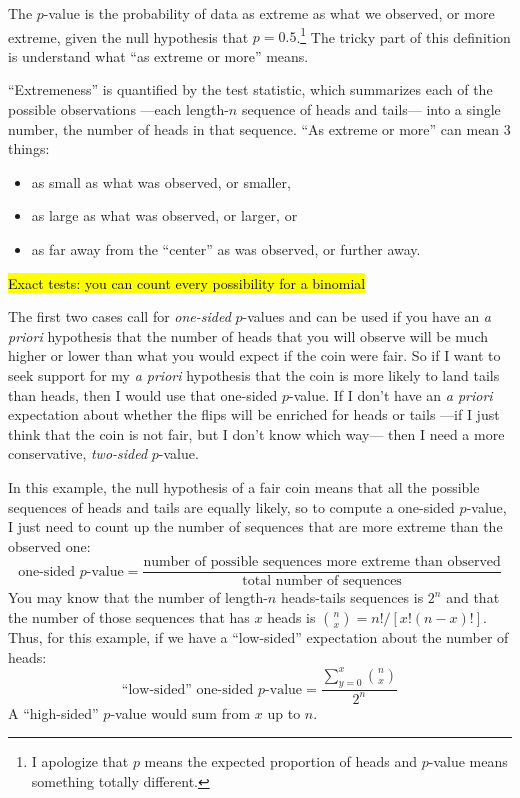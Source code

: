 The $p$-value is the probability of data as extreme as what we observed, or
more extreme, given the null hypothesis that $p = 0.5$.\footnote{I apologize
that $p$ means the expected proportion of heads and $p$-value means something
totally different.} The tricky part of this definition is understand what ``as
extreme or more'' means.

``Extremeness'' is quantified by the test statistic, which summarizes each of
the possible observations ---each length-$n$ sequence of heads and tails---
into a single number, the number of heads in that sequence. ``As extreme or
more'' can mean 3 things:
\begin{itemize}
    \item as small as what was observed, or smaller,
    \item as large as what was observed, or larger, or
    \item as far away from the ``center'' as was observed, or further away.
\end{itemize}

\hl{Exact tests: you can count every possibility for a binomial}

The first two cases call for \emph{one-sided} $p$-values and can be used if you
have an \textit{a priori} hypothesis that the number of heads that you will
observe will be much higher or lower than what you would expect if the coin
were fair. So if I want to seek support for my \textit{a priori} hypothesis
that the coin is more likely to land tails than heads, then I would use that
one-sided $p$-value. If I don't have an \textit{a priori} expectation about
whether the flips will be enriched for heads or tails ---if I just think that
the coin is not fair, but I don't know which way--- then I need a more
conservative, \emph{two-sided} $p$-value.

In this example, the null hypothesis of a fair coin means that all the possible
sequences of heads and tails are equally likely, so to compute a one-sided
$p$-value, I just need to count up the number of sequences that are more
extreme than the observed one:
\begin{equation}
    \text{one-sided $p$-value} = \frac{\text{number of possible sequences more extreme than observed}}{\text{total number of sequences}}
\end{equation}
You may know that the number of length-$n$ heads-tails sequences is $2^n$ and
that the number of those sequences that has $x$ heads is $\binom{n}{x} = n! /
\left[ x! (n-x)! \right]$. Thus, for this example, if we have a ``low-sided''
expectation about the number of heads:
\begin{equation}
    \text{``low-sided'' one-sided $p$-value} = \frac{\sum_{y=0}^x \binom{n}{x}}{2^n}
\end{equation}
A ``high-sided'' $p$-value would sum from $x$ up to $n$.

